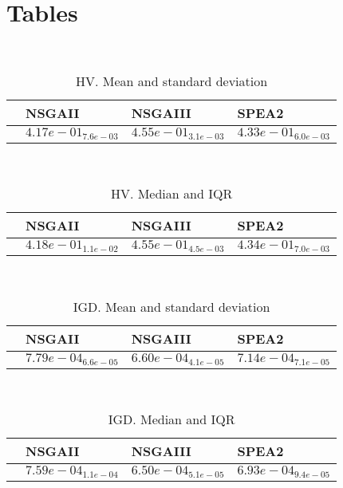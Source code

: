 \documentclass{article}
\title{}
\author{}
\begin{document}
\maketitle
\section{Tables}
\
\begin{table}
\caption{HV. Mean and standard deviation}
\label{table:mean.HV}
\centering
\begin{scriptsize}
\begin{tabular}{llll}
\hline & NSGAII & NSGAIII &  SPEA2\\
\hline
 & $  4.17e-01_{ 7.6e-03}$ & \cellcolor{gray95}$  4.55e-01_{ 3.1e-03}$ & \cellcolor{gray25}$  4.33e-01_{ 6.0e-03}$ \\
\hline
\end{tabular}
\end{scriptsize}
\end{table}
\
\begin{table}
\caption{HV. Median and IQR}
\label{table:median.HV}
\begin{scriptsize}
\centering
\begin{tabular}{llll}
\hline & NSGAII & NSGAIII &  SPEA2\\
\hline
 & $  4.18e-01_{ 1.1e-02}$ & \cellcolor{gray95}$  4.55e-01_{ 4.5e-03}$ & \cellcolor{gray25}$  4.34e-01_{ 7.0e-03}$ \\
\hline
\end{tabular}
\end{scriptsize}
\end{table}
\
\begin{table}
\caption{IGD. Mean and standard deviation}
\label{table:mean.IGD}
\centering
\begin{scriptsize}
\begin{tabular}{llll}
\hline & NSGAII & NSGAIII &  SPEA2\\
\hline
 & $  7.79e-04_{ 6.6e-05}$ & \cellcolor{gray95}$  6.60e-04_{ 4.1e-05}$ & \cellcolor{gray25}$  7.14e-04_{ 7.1e-05}$ \\
\hline
\end{tabular}
\end{scriptsize}
\end{table}
\
\begin{table}
\caption{IGD. Median and IQR}
\label{table:median.IGD}
\begin{scriptsize}
\centering
\begin{tabular}{llll}
\hline & NSGAII & NSGAIII &  SPEA2\\
\hline
 & $  7.59e-04_{ 1.1e-04}$ & \cellcolor{gray95}$  6.50e-04_{ 5.1e-05}$ & \cellcolor{gray25}$  6.93e-04_{ 9.4e-05}$ \\
\hline
\end{tabular}
\end{scriptsize}
\end{table}
\end{document}
